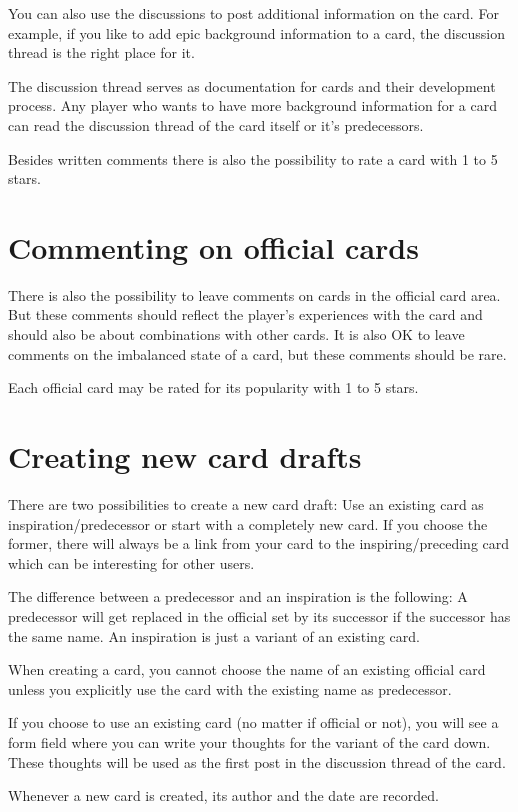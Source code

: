 \documentclass[a4paper, 11pt]{scrbook}
\begin{document}
You can also use the discussions to post additional information on the card. For example, if you like to add epic background information to a card, the discussion thread is the right place for it.

The discussion thread serves as documentation for cards and their development process. Any player who wants to have more background information for a card can read the discussion thread of the card itself or it's predecessors.

Besides written comments there is also the possibility to rate a card with 1 to 5 stars.

\section{Commenting on official cards}
There is also the possibility to leave comments on cards in the official card area. But these comments should reflect the player's experiences with the card and should also be about combinations with other cards. It is also OK to leave comments on the imbalanced state of a card, but these comments should be rare.

Each official card may be rated for its popularity with 1 to 5 stars.
\section{Creating new card drafts}
There are two possibilities to create a new card draft: Use an existing card as inspiration/predecessor or start with a completely new card. If you choose the former, there will always be a link from your card to the inspiring/preceding card which can be interesting for other users.

The difference between a predecessor and an inspiration is the following: A predecessor will get replaced in the official set by its successor if the successor has the same name. An inspiration is just a variant of an existing card.

When creating a card, you cannot choose the name of an existing official card unless you explicitly use the card with the existing name as predecessor.

If you choose to use an existing card (no matter if official or not), you will see a form field where you can write your thoughts for the variant of the card down. These thoughts will be used as the first post in the discussion thread of the card.

Whenever a new card is created, its author and the date are recorded.
\end{document}
